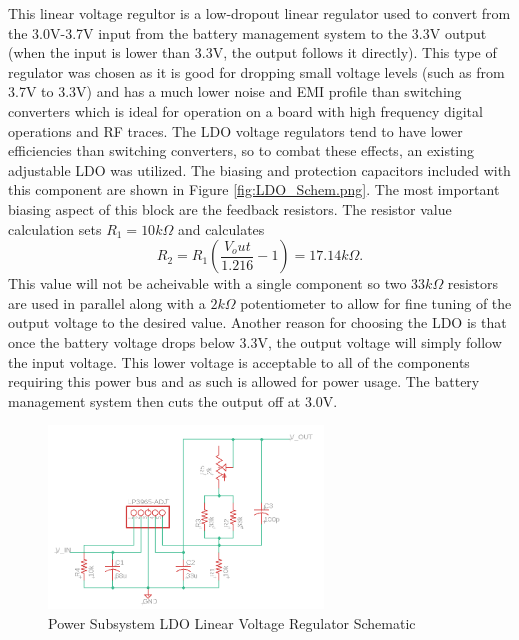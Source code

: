 \documentclass[12pt]{article}
\begin{document}
This linear voltage regultor is a low-dropout linear regulator used to convert from the 3.0V-3.7V input from the battery management system to the 3.3V output (when the input is lower than 3.3V, the output follows it directly). This type of regulator was chosen as it is good for dropping small voltage levels (such as from 3.7V to 3.3V) and has a much lower noise and EMI profile than switching converters which is ideal for operation on a board with high frequency digital operations and RF traces. The LDO voltage regulators tend to have lower efficiencies than switching converters, so to combat these effects, an existing adjustable LDO was utilized. The biasing and protection capacitors included with this component are shown in Figure \ref{fig:LDO_Schem.png}. The most important biasing aspect of this block are the feedback resistors. The resistor value calculation sets $R_1 = 10k\Omega$ and calculates
\[ R_2 = R_1 (\frac{V_out}{1.216} - 1) = 17.14k\Omega.\]
This value will not be acheivable with a single component so two $33k\Omega$ resistors are used in parallel along with a $2k\Omega$ potentiometer to allow for fine tuning of the output voltage to the desired value. Another reason for choosing the LDO is that once the battery voltage drops below 3.3V, the output voltage will simply follow the input voltage. This lower voltage is acceptable to all of the components requiring this power bus and as such is allowed for power usage. The battery management system then cuts the output off at 3.0V.

\begin{figure}[!h]
	\centering
	\includegraphics[width=0.65\textwidth]{LDO_Schem.png}
	\caption{Power Subsystem LDO Linear Voltage Regulator Schematic}
	\label{fig:boost_schem}
\end{figure}
\end{document}

